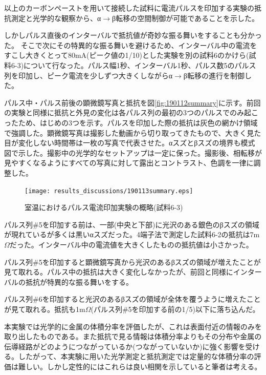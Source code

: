 以上のカーボンペーストを用いて接続した試料に電流パルスを印加する実験の抵抗測定と光学的な観察から、α$\to$β転移の空間制御が可能であることを示した。

しかしパルス直後のインターバルで抵抗値が奇妙な振る舞いをすることも分かった。
そこで次にその特異的な振る舞いを避けるため、インターバル中の電流をすこし大きくとって80mA(ピーク値の1/10)とした実験を別の試料6のかけら(試料6-3)について行なった。パルス幅1秒、インターバル1秒、パルス数5のパルス列を印加し、ピーク電流を少しずつ大きくしながらα$\to$β転移の進行を制御した。

パルス中・パルス前後の顕微鏡写真と抵抗を図\ref{fig:190112summary}に示す。前回の実験と同様に抵抗と外見の変化は各パルス列の最初の3つのパルスでのみ起こったため、はじめの3つを示す。パルスを印加した際の抵抗は灰色の網かけ領域で強調した。顕微鏡写真は撮影した動画から切り取ってきたもので、大きく見た目が変化しない時間帯は一枚の写真で代表させた。αスズとβスズの境界も模式図で示した。撮影中の光学的なセットアップは一定に保った。撮影後、相転移が見やすくなるようにすべての写真に対して露出とコントラスト、色調を一律に調整した。
\begin{landscape}
\begin{figure}[!h]
    \begin{center}
   \texttt{[image: results\_discussions/190113summary.eps]}
  \end{center}
    \caption{室温におけるパルス電流印加実験の概略(試料6-3)}
  \label{fig:190113summary}
\end{figure}
\end{landscape}

パルス列\#5を印加する前は、一部(中央と下部)に光沢のある銀色のβスズの領域が現れているが多くは黒いαスズだった。4端子法で測定した試料6-2の抵抗は7m$\Omega$だった。インターバル中の電流値を大きくしたものの抵抗値は小さかった。

パルス列\#5を印加すると顕微鏡写真から光沢のあるβスズの領域が増えたことが見て取れる。パルス中の抵抗は大きく変化しなかったが、前回と同様にインターバルの抵抗が特異的な振る舞いをする。

パルス列\#6を印加すると光沢のあるβスズの領域が全体を覆うように増えたことが見て取れる。抵抗も1m$\Omega$(パルス列\#5を印加する前の1/5)以下に落ち込んだ。

本実験では光学的に金属の体積分率を評価したが、これは表面付近の情報のみを取り出したものである。また抵抗で見る情報は体積分率よりもその分布や金属の伝導経路がどのようにつながっているか(つながっていないか)に強く影響を受ける。したがって、本実験に用いた光学測定と抵抗測定では定量的な体積分率の評価は難しい。しかし定性的にはこれらは良い相関を示していると筆者は考える。

